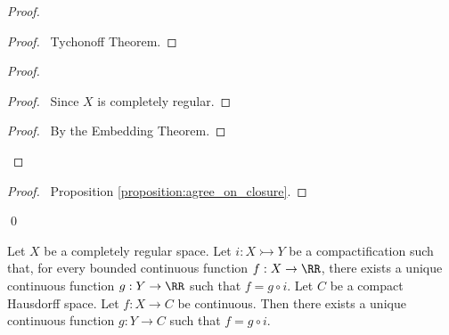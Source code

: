 \begin{proof}
    \pf
    \begin{proof}
        \pf\ Tychonoff Theorem.
    \end{proof}
    \begin{proof}
        \begin{proof}
            \pf\ Since $X$ is completely regular.
        \end{proof}
        \qedstep
        \begin{proof}
            \pf\ By the Embedding Theorem.
        \end{proof}
    \end{proof}
    \begin{proof}
        \pf\ Proposition \ref{proposition:agree_on_closure}.
    \end{proof}
    \qed
\end{proof}

\begin{theorem}
    Let $X$ be a completely regular space. Let $i : X \rightarrowtail Y$ be a compactification
    such that, for every
    bounded continuous function $f : X \rightarrow \RR$, there exists a unique continuous function $g : Y \rightarrow \RR$
    such that $f = g \circ i$.
    Let $C$ be a compact Hausdorff space. Let $f : X \rightarrow C$ be continuous. Then there exists a unique continuous
    function $g : Y \rightarrow C$ such that $f = g \circ i$.
\end{theorem}

